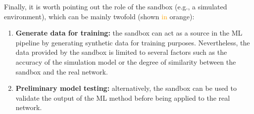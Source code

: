 \documentclass[journal]{IEEEtran}
\begin{document}
Finally, it is worth pointing out the role of the sandbox (e.g., a simulated environment), which can be mainly twofold (shown \textcolor{orange}{in} orange):
\begin{enumerate}
	\item \textbf{Generate data for training:} the sandbox can act as a source in the ML pipeline by generating synthetic data for training purposes. Nevertheless, the data provided by the sandbox is limited to several factors such as the accuracy of the simulation model or the degree of similarity between the sandbox and the real network. %
	\item \textbf{Preliminary model testing:} alternatively, the sandbox can be used to validate the output of the ML method before being applied to the real network.
\end{enumerate}

%
%

\end{document}
